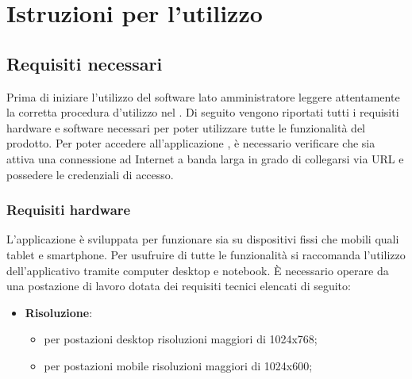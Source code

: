 %

\section{Istruzioni per l'utilizzo} %
\label{sec:istruzioni_per_l_utilizzo}


	\subsection{Requisiti necessari} %
	\label{sec:requisiti_necessari}
		Prima di iniziare l'utilizzo del software \projectName{} lato amministratore leggere attentamente la corretta procedura d'utilizzo nel \docNameVersionMU.\newline
		Di seguito vengono riportati tutti i requisiti hardware\gloss{} e software\gloss{} necessari per poter utilizzare tutte le funzionalità del prodotto.\newline
		Per poter accedere all'applicazione \projectName, è necessario verificare che sia attiva una connessione ad Internet a banda larga\gloss{} in grado di collegarsi via URL\gloss{} e possedere le credenziali\gloss{} di accesso.

		\subsubsection{Requisiti hardware} %
		\label{sec:requisiti_hardware}
			L'applicazione è sviluppata per funzionare sia su dispositivi fissi che mobili quali tablet e smartphone.\newline
			Per usufruire di tutte le funzionalità si raccomanda l'utilizzo dell'applicativo tramite computer desktop e notebook.\newline
			È necessario operare da una postazione di lavoro dotata dei requisiti tecnici elencati di seguito:
			\begin{itemize}
				\item \textbf{Risoluzione}:
				\begin{itemize}
					\item per postazioni desktop risoluzioni maggiori di 1024x768;
					\item per postazioni mobile risoluzioni maggiori di 1024x600;
				\end{itemize}
			\end{itemize}

